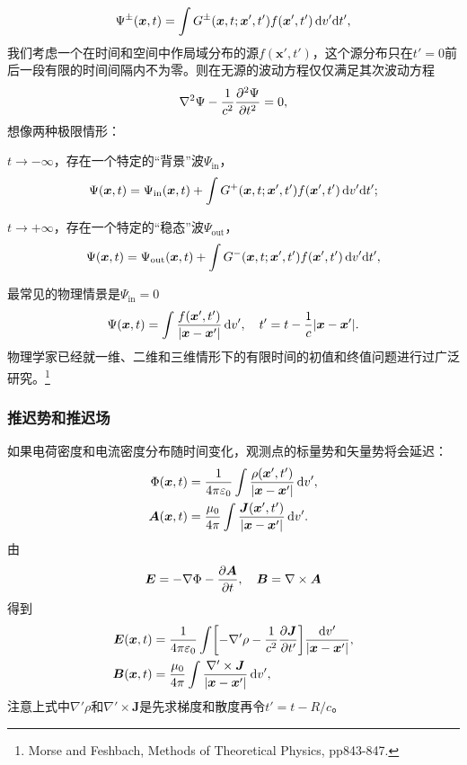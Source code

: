 \[
    \Psi^\pm(\bm x,t)=\int G^\pm(\bm x,t;\bm x',t')f(\bm x',t')\d v'\nd t',
\]
我们考虑一个在时间和空间中作局域分布的源$f(\bm x',t')$，这个源分布只在$t'=0$前后一段有限的时间间隔内不为零。则在无源的波动方程仅仅满足其次波动方程
\[
    \lapla\Psi-\frac1{c^2}\pv[2]\Psi t=0,
\]
想像两种极限情形：
\begin{compactenum}
	\item $t\to-\infty$，存在一个特定的“背景”波$\Psi_\text{in}$，
	\[
        \Psi(\bm x,t)=\Psi_\text{in}(\bm x,t)+\int G^+(\bm x,t;\bm x',t')f(\bm x',t')\d v'\nd t';
    \]
	\item $t\to+\infty$，存在一个特定的“稳态”波$\Psi_\text{out}$，
	\[
        \Psi(\bm x,t)=\Psi_\text{out}(\bm x,t)+\int G^-(\bm x,t;\bm x',t')f(\bm x',t')\d v'\nd t',
    \]
\end{compactenum}
最常见的物理情景是$\Psi_\text{in}=0$%
\begin{equation}
    \Psi(\bm x,t)=\int\frac{f(\bm x',t')}{|\bm x-\bm x'|}\d v',\quad t'=t-\frac1c|\bm x-\bm x'|.
\end{equation}
物理学家已经就一维、二维和三维情形下的有限时间的初值和终值问题进行过广泛研究。\footnote{Morse and Feshbach, Methods of Theoretical Physics, pp843-847.}
\subsubsection{推迟势和推迟场}
如果电荷密度和电流密度分布随时间变化，观测点的标量势和矢量势将会延迟：
\begin{align}
    \Phi(\bm x,t)&=\frac1{4\pi\varepsilon_0}\int\frac{\rho(\bm x',t')}{|\bm x-\bm x'|}\d v',\\
    \bm A(\bm x,t)&=\frac{\mu_0}{4\pi}\int\frac{\bm J(\bm x',t')}{|\bm x-\bm x'|}\d v'.
\end{align}
由
\[
    \bm E=-\nabla\Phi-\pv{\bm A}t,\quad\bm B=\curl\bm A
\]
得到
\begin{align}
    \bm E(\bm x,t)&=\frac1{4\pi\varepsilon_0}\int\biggfkh{-\nabla'\rho-\frac1{c^2}\pv{\bm J}{t'}}\frac{\d v'}{|\bm x-\bm x'|},\\
    \bm B(\bm x,t)&=\frac{\mu_0}{4\pi}\int\frac{\nabla'\times\bm J}{|\bm x-\bm x'|}\d v',
\end{align}
注意上式中$\nabla'\rho$和$\nabla'\times\bm J$是先求梯度和散度再令$t'=t-R/c$。

